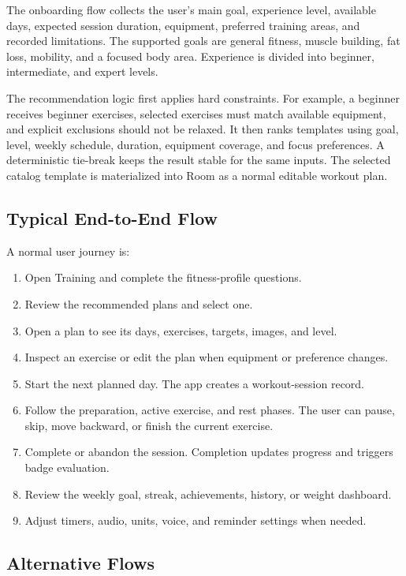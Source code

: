 The onboarding flow collects the user's main goal, experience level, available days, expected session duration, equipment, preferred training areas, and recorded limitations. The supported goals are general fitness, muscle building, fat loss, mobility, and a focused body area. Experience is divided into beginner, intermediate, and expert levels.

The recommendation logic first applies hard constraints. For example, a beginner receives beginner exercises, selected exercises must match available equipment, and explicit exclusions should not be relaxed. It then ranks templates using goal, level, weekly schedule, duration, equipment coverage, and focus preferences. A deterministic tie-break keeps the result stable for the same inputs. The selected catalog template is materialized into Room as a normal editable workout plan.

\subsection{Typical End-to-End Flow}

A normal user journey is:

\begin{enumerate}
    \item Open Training and complete the fitness-profile questions.
    \item Review the recommended plans and select one.
    \item Open a plan to see its days, exercises, targets, images, and level.
    \item Inspect an exercise or edit the plan when equipment or preference changes.
    \item Start the next planned day. The app creates a workout-session record.
    \item Follow the preparation, active exercise, and rest phases. The user can pause, skip, move backward, or finish the current exercise.
    \item Complete or abandon the session. Completion updates progress and triggers badge evaluation.
    \item Review the weekly goal, streak, achievements, history, or weight dashboard.
    \item Adjust timers, audio, units, voice, and reminder settings when needed.
\end{enumerate}

\subsection{Alternative Flows}

